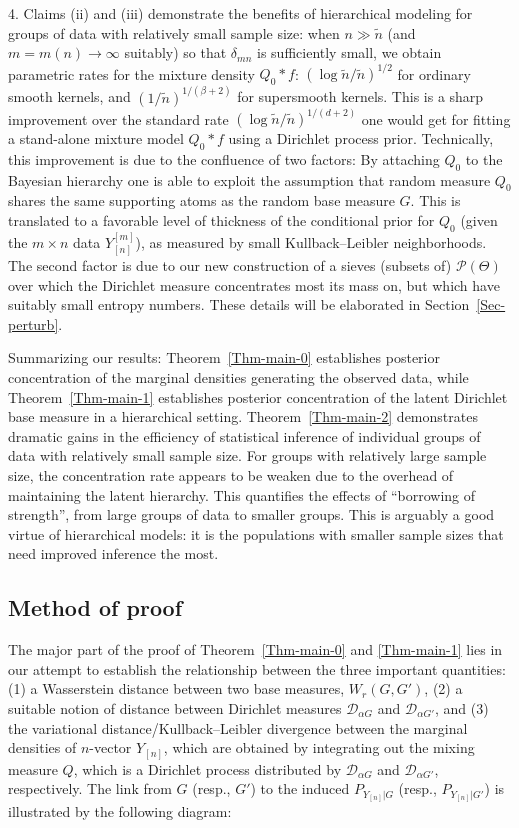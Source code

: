 \documentclass[MSNbibl,number,citesort]{arxbj}
\newcommand{\Pcal}{\mathscr{P}}
\newcommand{\DP}{\mathscr{D}}
\newcommand{\Wr}{W_r}
\newcommand{\PG}{P_{Y_{[n]}|G}}
\newcommand{\YYn}{Y_{[n]}}
\newcommand{\delmn}{\delta_{mn}}
\newcommand{\nn}{\tilde{n}}
\begin{document}
\begin{remarks*}
4. Claims (ii) and (iii) demonstrate
the benefits of hierarchical modeling for groups of data with relatively
small sample size: when $n \gg\nn$ (and $m = m(n) \rightarrow\infty$
suitably) so that $\delmn$
is sufficiently small, we obtain parametric rates for
the mixture density $Q_0*f$: $(\log\nn/\nn)^{1/2}$ for ordinary smooth
kernels, and $(1/\nn)^{1/(\beta+2)}$ for
supersmooth kernels. This is a sharp improvement over the
standard rate $(\log\nn/\nn)^{1/(d+2)}$ one would get for fitting
a stand-alone mixture model $Q_0*f$ using a Dirichlet process
prior. Technically, this improvement
is due to the confluence of two factors:
By attaching $Q_0$ to the Bayesian hierarchy
one is able to exploit the assumption that random measure $Q_0$ shares the
same supporting atoms as the random base measure $G$.
This is translated to a favorable level of thickness of the
conditional prior for $Q_0$ (given the $m\times n$ data $\YYn^{[m]}$),
as measured by small Kullback--Leibler neighborhoods.
The second factor is due to our new construction of a sieves
(subsets of) $\Pcal(\Theta)$ over which the Dirichlet measure
concentrates most its mass on, but which have suitably small entropy
numbers. These details will be elaborated in Section~\ref{Sec-perturb}.
\end{remarks*}

Summarizing our results:
Theorem~\ref{Thm-main-0} establishes posterior concentration of the
marginal densities
generating the observed data, while Theorem~\ref{Thm-main-1}
establishes posterior concentration
of the latent Dirichlet base measure in a hierarchical setting.
Theorem~\ref{Thm-main-2} demonstrates
dramatic gains in the efficiency of statistical
inference of individual groups of data with relatively small
sample size. For groups with relatively large sample size, the
concentration rate appears to be weaken due to the overhead\vadjust{\goodbreak} of
maintaining the latent hierarchy.
This quantifies the effects of ``borrowing of
strength'', from large groups of data to smaller groups.
This is arguably a good virtue of hierarchical models:
it is the populations with smaller sample sizes that need improved
inference the most. %

\subsection{Method of proof}
\label{sec-method}
The major part of the proof of Theorem~\ref{Thm-main-0}
and \ref{Thm-main-1} lies
in our attempt to establish the relationship
between the three important quantities:
(1) a Wasserstein distance between two base measures, $\Wr(G,G')$,
(2) a suitable notion of distance between
Dirichlet measures $\DP_{\alpha G}$ and $\DP_{\alpha G'}$, and
(3) the variational distance/Kullback--Leibler
divergence between the marginal densities of $n$-vector $\YYn$,
which are obtained by integrating out the mixing measure $Q$, %
which is a Dirichlet process distributed by $\DP_{\alpha G}$
and $\DP_{\alpha G'}$, respectively.
The link from $G$ (resp., $G'$) to the induced $\PG$ (resp., $P_{Y_{[n]}|G'}$)
is illustrated by the following diagram:
\end{document}
